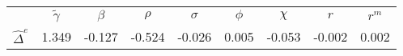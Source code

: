 \begin{tabular}{l*{8}{c}} \toprule 
& ${\tilde{\gamma}}$ & ${\beta}$ & ${\rho}$ & ${\sigma}$ & ${\phi}$ & ${\chi}$ & ${r}$ & ${r}^m$ \\ \cmidrule(lr){2-9} 
 $\hat{\Delta}^e$& 1.349 & -0.127 & -0.524 & -0.026 & 0.005 & -0.053 & -0.002 & 0.002 \\ \bottomrule 
 \end{tabular}